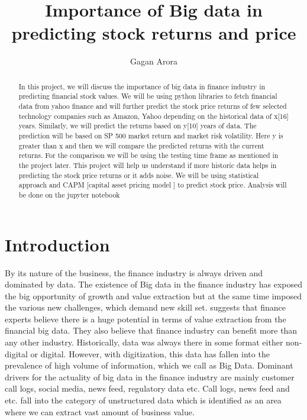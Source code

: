 \title{Importance of Big data in predicting stock returns and price}


\author{Gagan Arora}
\orcid{}




\renewcommand{\shortauthors}{Gagan Arora}


\begin{abstract}
In this project, we will discuss the importance of big data in finance industry in predicting financial stock values.  
We will be using python libraries to fetch financial data from yahoo finance and will further predict the stock price returns of few selected technology
companies such as Amazon, Yahoo depending on the historical data of x[16] years. Similarly, we will predict the returns based on y[10] years of data. 
The prediction will be based on SP 500 market return and market risk volatility. 
Here y is greater than x and then we will compare the predicted returns with the current returns. For the comparison we will be using the testing time frame as mentioned
in the project later. This project will help us understand if more historic data helps in predicting the stock price returns or it adds noise. 
We will be using statistical approach and CAPM [capital asset pricing model ] to predict stock price.  Analysis will be done on the jupyter notebook
\end{abstract}



\maketitle

\section{Introduction}
By its nature of the business, the finance industry is always driven and dominated by data. 
The existence of Big data in the finance industry has exposed the big opportunity of growth and value extraction but at the 
same time imposed the various new challenges, which demand new skill set. \cite{Ref1} suggests that finance experts believe there 
is a huge potential in terms of value extraction from the financial big data.
They also believe that finance industry can benefit more than any other industry.  Historically, data was always there in some format either 
non-digital or digital. However, with digitization, this data has fallen into the prevalence of high volume of information, which we call as Big Data.
Dominant drivers for the actuality of big data in the finance industry are mainly customer call logs, social media, news feed, regulatory data etc. 
Call logs, news feed and etc. fall into the category of unstructured data which is identified as an area where we can extract vast amount of business value.


